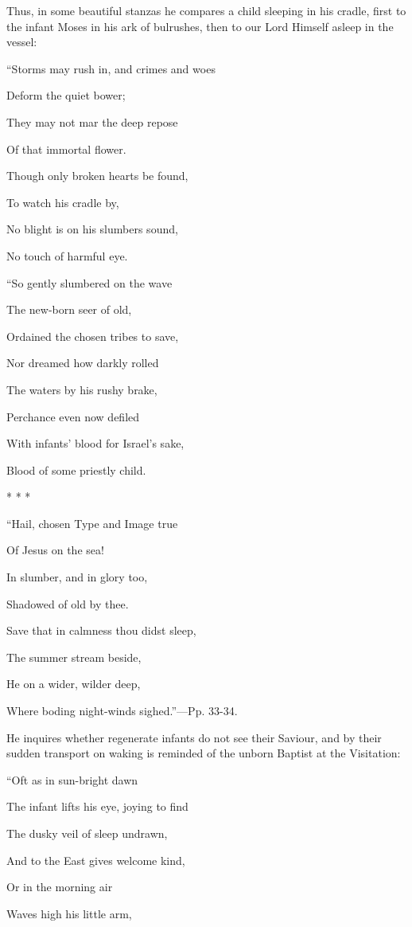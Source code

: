 Thus, in some beautiful stanzas he compares a
child sleeping in his cradle, first to the infant Moses in his ark of
bulrushes, then to our Lord Himself asleep in the vessel:

``Storms
may rush in, and crimes and woes

Deform the quiet bower;

They may not mar the deep repose

Of that immortal flower.

Though only broken hearts be found,

To watch his cradle by,

No blight is on his slumbers sound,

No touch of harmful eye.

``So
gently slumbered on the wave

The new-born seer of old,

Ordained the chosen tribes to save,

Nor dreamed how darkly rolled 

The waters by his rushy brake,

Perchance even now defiled

With infants' blood for Israel's sake,

Blood of some priestly child.

*
*
*

``Hail,
chosen Type and Image true

Of Jesus on the sea!

In slumber, and in glory too,

Shadowed of old by thee.

Save that in calmness thou didst sleep,

The summer stream beside,

He on a wider, wilder deep,

Where boding night-winds sighed.''—Pp. 33-34.

He inquires whether regenerate infants do not see
their Saviour, and by their sudden transport on waking is reminded of
the unborn Baptist at the Visitation:

``Oft as in sun-bright dawn

The infant lifts his eye, joying to find

The dusky veil of sleep undrawn,

And to the East gives welcome kind,

Or in the
morning air

Waves high his little arm,

